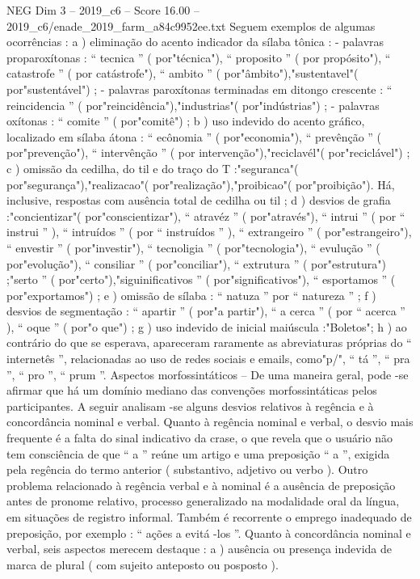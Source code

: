 \begin{textsample}{NEG Dim 3 – 2019\_c6 – Score 16.00 – 2019\_c6/enade\_2019\_farm\_a84c9952ee.txt}
Seguem exemplos de algumas ocorrências : a ) eliminação do acento indicador da sílaba tônica : - palavras proparoxítonas : “ tecnica ” ( por"técnica"), “ proposito ” ( por propósito"), “ catastrofe ” ( por catástrofe"), “ ambito ” ( por"âmbito"),"sustentavel"( por"sustentável") ; - palavras paroxítonas terminadas em ditongo crescente : “ reincidencia ” ( por"reincidência"),"industrias"( por"indústrias") ; - palavras oxítonas : “ comite ” ( por"comitê") ; b ) uso indevido do acento gráfico, localizado em sílaba átona : “ ecônomia ” ( por"economia"), “ prevênção ” ( por"prevenção"), “ intervênção ” ( por intervenção"),"reciclavél"( por"reciclável") ; c ) omissão da cedilha, do til e do traço do T :"seguranca"( por"segurança"),"realizacao"( por"realização"),"proibicao"( por"proibição").
Há, inclusive, respostas com ausência total de cedilha ou til ; d ) desvios de grafia :"concientizar"( por"conscientizar"), “ atravéz ” ( por"através"), “ intrui ” ( por “ instrui ” ), “ intruídos ” ( por “ instruídos ” ), “ extrangeiro ” ( por"estrangeiro"), “ envestir ” ( por"investir"), “ tecnoligia ” ( por"tecnologia"), “ evulução ” ( por"evolução"), “ consiliar ” ( por"conciliar"), “ extrutura ” ( por"estrutura") ;"serto ” ( por"certo"),"siguinificativos ” ( por"significativos"), “ esportamos ” ( por"exportamos") ; e ) omissão de sílaba : “ natuza ” por “ natureza ” ; f ) desvios de segmentação : “ apartir ” ( por"a partir"), “ a cerca ” ( por “ acerca ” ), “ oque ” ( por"o que") ; g ) uso indevido de inicial maiúscula :"Boletos"; h ) ao contrário do que se esperava, apareceram raramente as abreviaturas próprias do “ internetês ”, relacionadas ao uso de redes sociais e emails, como"p/", “ tá ”, “ pra ”, “ pro ”, “ prum ”.
Aspectos morfossintáticos – De uma maneira geral, pode -se afirmar que há um domínio mediano das convenções morfossintáticas pelos participantes.
A seguir analisam -se alguns desvios relativos à regência e à concordância nominal e verbal.
Quanto à regência nominal e verbal, o desvio mais frequente é a falta do sinal indicativo da crase, o que revela que o usuário não tem consciência de que “ a ” reúne um artigo e uma preposição “ a ”, exigida pela regência do termo anterior ( substantivo, adjetivo ou verbo ).
Outro problema relacionado à regência verbal e à nominal é a ausência de preposição antes de pronome relativo, processo generalizado na modalidade oral da língua, em situações de registro informal.
Também é recorrente o emprego inadequado de preposição, por exemplo : “ ações a evitá -los ”.
Quanto à concordância nominal e verbal, seis aspectos merecem destaque : a ) ausência ou presença indevida de marca de plural ( com sujeito anteposto ou posposto ).

\end{textsample}
